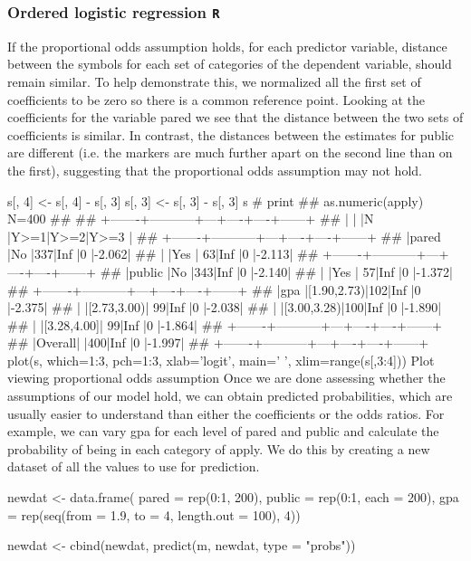 \begin{frame}[fragile]
	\frametitle{Ordered logistic regression \texttt{R} }
	\Large
	If the proportional odds assumption holds, for each predictor variable, distance between the symbols for each set of categories of the dependent variable, should remain similar. To help demonstrate this, we normalized all the first set of coefficients to be zero so there is a common reference point. Looking at the coefficients for the variable pared we see that the distance between the two sets of coefficients is similar. In contrast, the distances between the estimates for public are different (i.e. the markers are much further apart on the second line than on the first), suggesting that the proportional odds assumption may not hold.

s[, 4] <- s[, 4] - s[, 3]
s[, 3] <- s[, 3] - s[, 3]
s # print
## as.numeric(apply)    N=400
## 
## +-------+-----------+---+----+----+------+
## |       |           |N  |Y>=1|Y>=2|Y>=3  |
## +-------+-----------+---+----+----+------+
## |pared  |No         |337|Inf |0   |-2.062|
## |       |Yes        | 63|Inf |0   |-2.113|
## +-------+-----------+---+----+----+------+
## |public |No         |343|Inf |0   |-2.140|
## |       |Yes        | 57|Inf |0   |-1.372|
## +-------+-----------+---+----+----+------+
## |gpa    |[1.90,2.73)|102|Inf |0   |-2.375|
## |       |[2.73,3.00)| 99|Inf |0   |-2.038|
## |       |[3.00,3.28)|100|Inf |0   |-1.890|
## |       |[3.28,4.00]| 99|Inf |0   |-1.864|
## +-------+-----------+---+----+----+------+
## |Overall|           |400|Inf |0   |-1.997|
## +-------+-----------+---+----+----+------+
plot(s, which=1:3, pch=1:3, xlab='logit', main=' ', xlim=range(s[,3:4]))
Plot viewing proportional odds assumption
Once we are done assessing whether the assumptions of our model hold, we can obtain predicted probabilities, which are usually easier to understand than either the coefficients or the odds ratios. For example, we can vary gpa for each level of pared and public and calculate the probability of being in each category of apply. We do this by creating a new dataset of all the values to use for prediction.

newdat <- data.frame(
  pared = rep(0:1, 200),
  public = rep(0:1, each = 200),
  gpa = rep(seq(from = 1.9, to = 4, length.out = 100), 4))

newdat <- cbind(newdat, predict(m, newdat, type = "probs"))


\end{frame}
